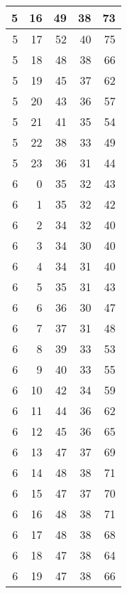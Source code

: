 \begin{longtable}{|r|r|r|r|r|}
    \hline
    5     & 16    & 49    & 38    & 73 \\
    \hline
    5     & 17    & 52    & 40    & 75 \\
    \hline
    5     & 18    & 48    & 38    & 66 \\
    \hline
    5     & 19    & 45    & 37    & 62 \\
    \hline
    5     & 20    & 43    & 36    & 57 \\
    \hline
    5     & 21    & 41    & 35    & 54 \\
    \hline
    5     & 22    & 38    & 33    & 49 \\
    \hline
    5     & 23    & 36    & 31    & 44 \\
    \hline
    6     & 0     & 35    & 32    & 43 \\
    \hline
    6     & 1     & 35    & 32    & 42 \\
    \hline
    6     & 2     & 34    & 32    & 40 \\
    \hline
    6     & 3     & 34    & 30    & 40 \\
    \hline
    6     & 4     & 34    & 31    & 40 \\
    \hline
    6     & 5     & 35    & 31    & 43 \\
    \hline
    6     & 6     & 36    & 30    & 47 \\
    \hline
    6     & 7     & 37    & 31    & 48 \\
    \hline
    6     & 8     & 39    & 33    & 53 \\
    \hline
    6     & 9     & 40    & 33    & 55 \\
    \hline
    6     & 10    & 42    & 34    & 59 \\
    \hline
    6     & 11    & 44    & 36    & 62 \\
    \hline
    6     & 12    & 45    & 36    & 65 \\
    \hline
    6     & 13    & 47    & 37    & 69 \\
    \hline
    6     & 14    & 48    & 38    & 71 \\
    \hline
    6     & 15    & 47    & 37    & 70 \\
    \hline
    6     & 16    & 48    & 38    & 71 \\
    \hline
    6     & 17    & 48    & 38    & 68 \\
    \hline
    6     & 18    & 47    & 38    & 64 \\
    \hline
    6     & 19    & 47    & 38    & 66 \\

\end{longtable}
